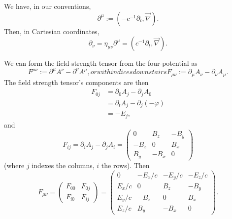 \label{chunk:relativity:partial-derivatives}
We have, in our conventions,
\begin{equation}
\partial^{\mu} := (-c^{-1}\partial_{t}, \vec{\nabla}).
\end{equation}
Then, in Cartesian coordinates,
\begin{equation}
\partial_{\nu} = \eta_{\mu\nu}\partial^{\mu} = (c^{-1}\partial_{t}, \vec{\nabla}).
\end{equation}

We can form the field-strength tensor from the four-potential as
\begin{subequations}
\begin{equation}
F^{\mu\nu} := \partial^{\mu}A^{\nu} - \partial^{\nu}A^{\mu},
\end{equation}
or with indices downstairs
\begin{equation}
F_{\mu\nu} := \partial_{\mu}A_{\nu} - \partial_{\nu}A_{\mu}.
\end{equation}
\end{subequations}
The field strength tensor's components are then
\begin{subequations}
\begin{align}
F_{0j} &= \partial_{0}A_{j} - \partial_{j}A_{0}\\
&= \partial_{t}A_{j} - \partial_{j}(-\varphi)\\
&= -E_{j},
\end{align}
\end{subequations}
and
\begin{equation}
F_{ij} = \partial_{i}A_{j} - \partial_{j}A_{i} = \begin{pmatrix}
 0     &  B_{z} & -B_{y}\\
-B_{z} &  0     & B_{x}\\
 B_{y} & -B_{x} & 0
\end{pmatrix}
\end{equation}
(where $j$ indexes the columns, $i$ the rows). Then
\begin{equation}
F_{\mu\nu} = \begin{pmatrix}F_{00} & F_{0j}\\
F_{i0} & F_{ij}
\end{pmatrix} = \begin{pmatrix}
 0       & -E_{x}/c & -E_{y}/c & -E_{z}/c\\
 E_{x}/c &  0       &  B_{z}   & -B_{y}\\
 E_{y}/c & -B_{z}   &  0       &  B_{x}\\
 E_{z}/c &  B_{y}   & -B_{x}   &  0
\end{pmatrix}.
\end{equation}


